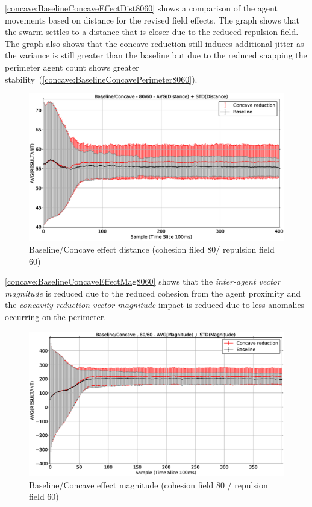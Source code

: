 \autoref{concave:BaselineConcaveEffectDist8060} shows a comparison of the agent movements based on distance for the revised field effects. The graph shows that the swarm settles to a distance that is closer due to the reduced repulsion field. The graph also shows that the concave reduction still induces additional jitter as the variance is still greater than the baseline but due to the reduced snapping the perimeter agent count shows greater stability~(\autoref{concave:BaselineConcavePerimeter8060}). 
\begin{figure}[H]
\begin{center}
\includegraphics[width=14cm]{CHAPTER-7/figures/BaselineConcaveEffectDist8060}
\end{center}
\caption{Baseline/Concave effect distance (cohesion filed 80/ repulsion field 60)\label{concave:BaselineConcaveEffectDist8060}}
\end{figure}

\autoref{concave:BaselineConcaveEffectMag8060} shows that the \textit{inter-agent vector magnitude} is reduced due to the reduced cohesion from the agent proximity and the \textit{concavity reduction vector magnitude} impact is reduced due to less anomalies occurring on the perimeter.
\begin{figure}[H]
\begin{center}
\includegraphics[width=14cm]{CHAPTER-7/figures/BaselineConcaveEffectMag8060}
\end{center}
\caption{Baseline/Concave effect magnitude (cohesion field 80 / repulsion field 60)\label{concave:BaselineConcaveEffectMag8060}}
\end{figure}

